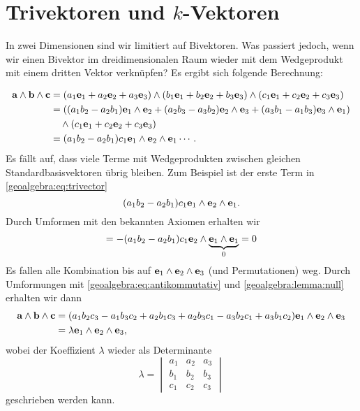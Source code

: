 \section{Trivektoren und $k$-Vektoren}
\label{geoalgebra:section:trivectors-n-vectors}
In zwei Dimensionen sind wir limitiert auf Bivektoren. Was passiert jedoch, wenn wir einen Bivektor
im dreidimensionalen Raum wieder mit dem Wedgeprodukt mit einem dritten Vektor verknüpfen?
Es ergibt sich folgende Berechnung:
{
\begin{equation} 
\begin{aligned}
\mathbf{a} \wedge \mathbf{b} \wedge \mathbf{c} &= (a_1 \mathbf{e}_1 + a_2 \mathbf{e}_2 + a_3 \mathbf{e}_3) \wedge (b_1 \mathbf{e}_1 + b_2 \mathbf{e}_2 + b_3 \mathbf{e}_3) \wedge (c_1 \mathbf{e}_1 + c_2 \mathbf{e}_2 + c_3 \mathbf{e}_3) \\
&= ((a_1 b_2 - a_2 b_1) \mathbf{e}_1 \wedge \mathbf{e}_2 +(a_2 b_3 - a_3 b_2) \mathbf{e}_2 \wedge \mathbf{e}_3 +(a_3 b_1 - a_1 b_3) \mathbf{e}_3 \wedge \mathbf{e}_1) \\
&\quad\wedge (c_1 \mathbf{e}_1 + c_2 \mathbf{e}_2 + c_3 \mathbf{e}_3) \\
&= (a_1 b_2 - a_2 b_1) c_1 \mathbf{e}_1 \wedge \mathbf{e}_2 \wedge \mathbf{e}_1 \cdots.
\end{aligned}
\label{geoalgebra:eq:trivector}
\end{equation}
Es fällt auf, dass viele Terme mit Wedgeprodukten zwischen gleichen Standardbasisvektoren übrig bleiben. Zum Beispiel ist der erste Term in \eqref{geoalgebra:eq:trivector}
\begin{equation}
(a_1 b_2 - a_2 b_1) c_1 \mathbf{e}_1 \wedge \mathbf{e}_2 \wedge \mathbf{e}_1.
\end{equation}
Durch Umformen mit den bekannten Axiomen erhalten wir
\begin{equation}
=-(a_1 b_2 - a_2 b_1) c_1 \mathbf{e}_2 \wedge \underbrace{\mathbf{e}_1 \wedge \mathbf{e}_1}_{0} = 0
\end{equation}
Es fallen alle Kombination bis auf $\mathbf{e}_1 \wedge \mathbf{e}_2 \wedge \mathbf{e}_3$ (und Permutationen) weg.
Durch Umformungen mit \eqref{geoalgebra:eq:antikommutativ} und
\eqref{geoalgebra:lemma:null} erhalten wir dann
\begin{equation}
  \begin{aligned}
  \mathbf{a} \wedge \mathbf{b} \wedge \mathbf{c} &= (a_1 b_2 c_3 - a_1 b_3 c_2 + a_2 b_1 c_3 + a_2 b_3 c_1 - a_3 b_2 c_1 + a_3 b_1 c_2) \mathbf{e}_1 \wedge \mathbf{e}_2 \wedge \mathbf{e}_3 \\
  &= \lambda \mathbf{e}_1 \wedge \mathbf{e}_2 \wedge \mathbf{e}_3,
  \end{aligned}
\end{equation}
wobei der Koeffizient $\lambda$ wieder als Determinante
\begin{equation}
\lambda = \begin{vmatrix} a_1 & a_2 & a_3 \\ b_1 & b_2 & b_3 \\ c_1 & c_2 & c_3 \end{vmatrix}
\end{equation}
geschrieben werden kann.

}
